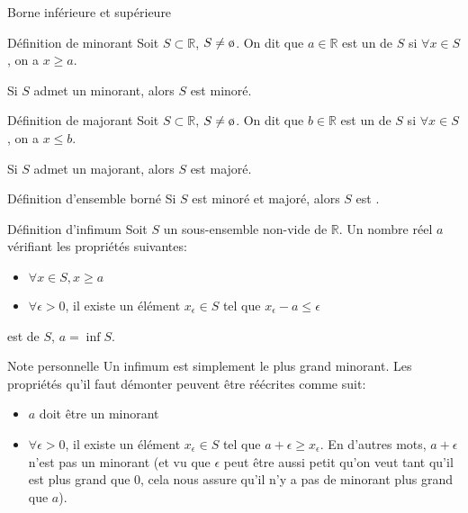\documentclass{article}
\begin{document}
\begin{parag}{Borne inférieure et supérieure}
    \begin{subparag}{Définition de minorant}
        Soit $S \subset \mathbb{R}$, $S \neq \o$. On dit que $a \in \mathbb{R}$ est un  de $S$ si $\forall x \in S$, on a $x \geq a$.


        Si $S$ admet un minorant, alors $S$ est minoré.
    \end{subparag}

    \begin{subparag}{Définition de majorant}
        Soit $S \subset \mathbb{R}$, $S \neq \o$. On dit que $b \in \mathbb{R}$ est un  de $S$ si $\forall x \in S$, on a $x \leq b$.

        Si $S$ admet un majorant, alors $S$ est majoré.
    \end{subparag}

    \begin{subparag}{Définition d'ensemble borné}
        Si $S$ est minoré et majoré, alors $S$ est .
    \end{subparag}

    \begin{subparag}{Définition d'infimum}
        Soit $S$ un sous-ensemble non-vide de $\mathbb{R}$. Un nombre réel $a$ vérifiant les propriétés suivantes:
        \begin{itemize}
            \item $\forall x \in S, x \geq a$
            \item $\forall \epsilon > 0$, il existe un élément $x_{\epsilon} \in S$ tel que $x_{\epsilon} - a \leq \epsilon$
        \end{itemize}
        est  de $S$, $a = \inf S$.
    \end{subparag}

    \begin{subparag}{Note personnelle}
        Un infimum est simplement le plus grand minorant. Les propriétés qu'il faut démonter peuvent être réécrites comme suit:
        \begin{itemize}
            \item $a$ doit être un minorant
            \item $\forall \epsilon > 0$, il existe un élément $x_{\epsilon} \in S$ tel que $a +  \epsilon \geq x_{\epsilon}$. En d'autres mots, $a + \epsilon$ n'est pas un minorant (et vu que $\epsilon$ peut être aussi petit qu'on veut tant qu'il est plus grand que $0$, cela nous assure qu'il n'y a pas de minorant plus grand que $a$).
        \end{itemize}
    \end{subparag}



\end{parag}
\end{document}
